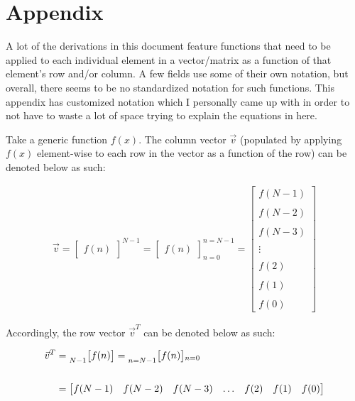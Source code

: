 \documentclass{article}
\begin{document}
\section {Appendix}

A lot of the derivations in this document feature functions that need to be applied to each individual element in a vector/matrix as a function of that element's row and/or column. A few fields use some of their own notation, but overall, there seems to be no standardized notation for such functions. This appendix has customized notation which I personally came up with in order to not have to waste a lot of space trying to explain the equations in here. \newline

Take a generic function $f(x)$. The column vector $\vec{v}$ (populated by applying $f(x)$ element-wise to each row in the vector as a function of the row) can be denoted below as such:

\begin{align*}
    \vec{v} = \begin{bmatrix} f(n) \end{bmatrix}^{N - 1}
            = \begin{bmatrix} f(n) \end{bmatrix}^{n=N - 1}_{n=0}
            = \begin{bmatrix}
                    f(N - 1) \\ \\
                    f(N - 2) \\ \\
                    f(N - 3) \\ \\
                      \vdots \\ \\
                    f(    2) \\ \\
                    f(    1) \\ \\
                    f(    0) 
                \end{bmatrix}
  \end{align*}

Accordingly, the row vector $\vec{v}^{T}$ can be denoted below as such:

\begin{align*}
    \vec{v}^{T}&= \prescript{}{N - 1}{\begin{bmatrix} f(n) \end{bmatrix}}
                = \prescript{}{n=N - 1}{\begin{bmatrix} f(n) \end{bmatrix}}_{n=0} \\ \\
               &= \begin{bmatrix} f(N - 1) & f(N - 2) & f(N - 3) & \ldots & f(2) & f(1) & f(0) \end{bmatrix} \\
  \end{align*} 
\end{document}
